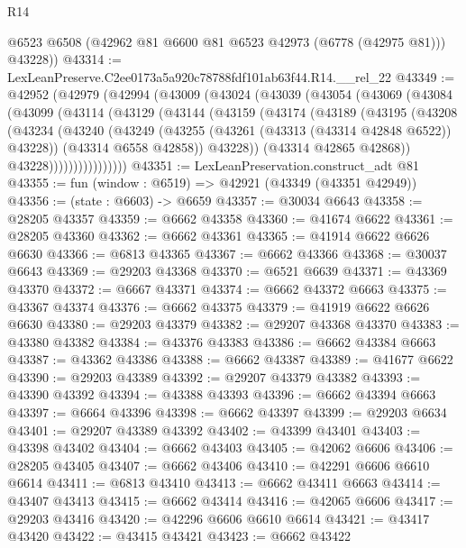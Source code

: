 \begin{lexlean}{R14}
\begin{coremodule}
        @6523
        @6508
        (@42962 @81 @6600 @81 @6523 @42973 (@6778 (@42975 @81)))
        @43228))
@43314 := LexLeanPreserve.C2ee0173a5a920c78788fdf101ab63f44.R14.__rel_22
@43349 := @42952
    (@42979
      (@42994
        (@43009
          (@43024
            (@43039
              (@43054
                (@43069
                  (@43084
                    (@43099
                      (@43114
                        (@43129
                          (@43144
                            (@43159
                              (@43174
                                (@43189
                                  (@43195
                                    (@43208
                                      (@43234
                                        (@43240
                                          (@43249
                                            (@43255 (@43261 (@43313 (@43314 @42848 @6522)) @43228))
                                            (@43314 @6558 @42858))
                                          @43228))
                                      (@43314 @42865 @42868))
                                    @43228))))))))))))))))
@43351 := LexLeanPreservation.construct_adt @81
@43355 := fun (window : @6519) => @42921 (@43349 (@43351 @42949))
@43356 := (state : @6603) -> @6659
@43357 := @30034 @6643
@43358 := @28205 @43357
@43359 := @6662 @43358
@43360 := @41674 @6622
@43361 := @28205 @43360
@43362 := @6662 @43361
@43365 := @41914 @6622 @6626 @6630
@43366 := @6813 @43365
@43367 := @6662 @43366
@43368 := @30037 @6643
@43369 := @29203 @43368
@43370 := @6521 @6639
@43371 := @43369 @43370
@43372 := @6667 @43371
@43374 := @6662 @43372 @6663
@43375 := @43367 @43374
@43376 := @6662 @43375
@43379 := @41919 @6622 @6626 @6630
@43380 := @29203 @43379
@43382 := @29207 @43368 @43370
@43383 := @43380 @43382
@43384 := @43376 @43383
@43386 := @6662 @43384 @6663
@43387 := @43362 @43386
@43388 := @6662 @43387
@43389 := @41677 @6622
@43390 := @29203 @43389
@43392 := @29207 @43379 @43382
@43393 := @43390 @43392
@43394 := @43388 @43393
@43396 := @6662 @43394 @6663
@43397 := @6664 @43396
@43398 := @6662 @43397
@43399 := @29203 @6634
@43401 := @29207 @43389 @43392
@43402 := @43399 @43401
@43403 := @43398 @43402
@43404 := @6662 @43403
@43405 := @42062 @6606
@43406 := @28205 @43405
@43407 := @6662 @43406
@43410 := @42291 @6606 @6610 @6614
@43411 := @6813 @43410
@43413 := @6662 @43411 @6663
@43414 := @43407 @43413
@43415 := @6662 @43414
@43416 := @42065 @6606
@43417 := @29203 @43416
@43420 := @42296 @6606 @6610 @6614
@43421 := @43417 @43420
@43422 := @43415 @43421
@43423 := @6662 @43422

\end{coremodule}
\end{lexlean}
